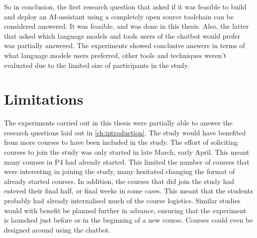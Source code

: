 So in conclusion, the first research question that asked if it was feasible to build and deploy an AI-assistant using a completely open source toolchain can be considered answered. It was feasible, and was done in this thesis. Also, the latter that asked which language models and tools users of the chatbot would prefer was partially answered. The experiments showed conclusive answers in terms of what language models users preferred, other tools and techniques weren't evaluated due to the limited size of participants in the study.
















\section{Limitations}
\label{sec:conclusion_limitations}


The experiments carried out in this thesis were partially able to answer the research questions laid out in \autoref{ch:introduction}. The study would have benefited from more courses to have been included in the study. The effort of soliciting courses to join the study was only started in late March, early April. This meant many courses in P4 had already started. This limited the number of courses that were interesting in joining the study, many hesitated changing the format of already started courses. In addition, the courses that did join the study had entered their final half, or final weeks in some cases. This meant that the students probably had already internalised much of the course logistics. Similar studies would with benefit be planned further in advance, ensuring that the experiment is launched just before or in the beginning of a new course. Courses could even be designed around using the chatbot.


